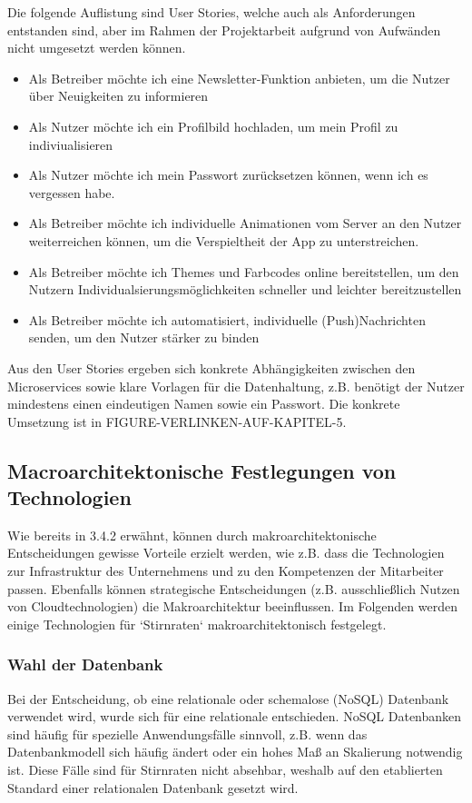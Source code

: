 {Die folgende Auflistung sind User Stories, welche auch als Anforderungen entstanden sind, aber im Rahmen der Projektarbeit aufgrund von Aufwänden nicht umgesetzt werden können.

\begin{itemize}
	\item Als Betreiber möchte ich eine Newsletter-Funktion anbieten, um die Nutzer über Neuigkeiten zu informieren
	\item Als Nutzer möchte ich ein Profilbild hochladen, um mein Profil zu indiviualisieren
	\item Als Nutzer möchte ich mein Passwort zurücksetzen können, wenn ich es vergessen habe. 
	\item Als Betreiber möchte ich individuelle Animationen vom Server an den Nutzer weiterreichen können, um die Verspieltheit der App zu unterstreichen.
	\item Als Betreiber möchte ich Themes und Farbcodes online bereitstellen, um den Nutzern Individualsierungsmöglichkeiten schneller und leichter bereitzustellen 
	\item Als Betreiber möchte ich automatisiert, individuelle (Push)Nachrichten senden, um den Nutzer stärker zu binden
\end{itemize}

Aus den User Stories ergeben sich konkrete Abhängigkeiten zwischen den Microservices sowie klare Vorlagen für die Datenhaltung, z.B. benötigt der Nutzer mindestens einen eindeutigen Namen sowie ein Passwort. Die konkrete Umsetzung ist in FIGURE-VERLINKEN-AUF-KAPITEL-5.

\subsection{Macroarchitektonische Festlegungen von Technologien}
Wie bereits in 3.4.2 erwähnt, können durch makroarchitektonische Entscheidungen gewisse Vorteile erzielt werden, wie z.B. dass die Technologien zur Infrastruktur des Unternehmens und zu den Kompetenzen der Mitarbeiter passen. Ebenfalls können strategische Entscheidungen (z.B. ausschließlich Nutzen von Cloudtechnologien) die Makroarchitektur beeinflussen. Im Folgenden werden einige Technologien für `Stirnraten` makroarchitektonisch festgelegt. 

\subsubsection{Wahl der Datenbank}
Bei der Entscheidung, ob eine relationale oder schemalose (NoSQL) Datenbank verwendet wird, wurde sich für eine relationale entschieden. NoSQL Datenbanken sind häufig für spezielle Anwendungsfälle sinnvoll, z.B. wenn das Datenbankmodell sich häufig ändert oder ein hohes Maß an Skalierung notwendig ist. Diese Fälle sind für Stirnraten nicht absehbar, weshalb auf den etablierten Standard einer relationalen Datenbank gesetzt wird.\cite{kloeckner2015nosql_vs_relationale_datenbank}\\

}
